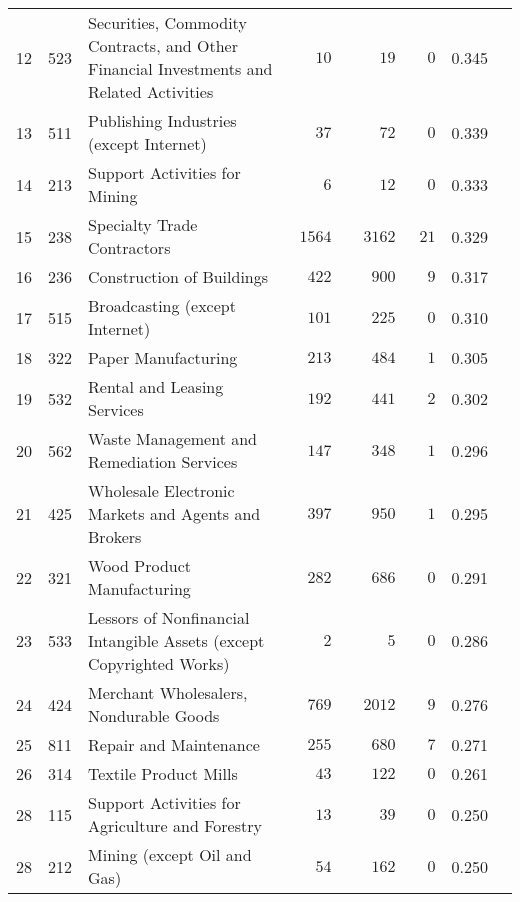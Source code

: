 \documentclass[9pt, oneside]{article}   	%
\begin{document}
\begin{longtable}{lcp{3 in}ccccc}
12  & 523 & Securities, Commodity Contracts, and Other Financial Investments and Related Activities & $\phantom{000}10$ & $\phantom{0000}19$ & $\phantom{00}0$ & 0.345 \\
13  & 511 & Publishing Industries (except Internet) & $\phantom{000}37$ & $\phantom{0000}72$ & $\phantom{00}0$ & 0.339 \\
14  & 213 & Support Activities for Mining & $\phantom{0000}6$ & $\phantom{0000}12$ & $\phantom{00}0$ & 0.333 \\
15  & 238 & Specialty Trade Contractors & $\phantom{0}1564$ & $\phantom{00}3162$ & $\phantom{0}21$ & 0.329 \\
16  & 236 & Construction of Buildings & $\phantom{00}422$ & $\phantom{000}900$ & $\phantom{00}9$ & 0.317 \\
17  & 515 & Broadcasting (except Internet) & $\phantom{00}101$ & $\phantom{000}225$ & $\phantom{00}0$ & 0.310 \\
18  & 322 & Paper Manufacturing & $\phantom{00}213$ & $\phantom{000}484$ & $\phantom{00}1$ & 0.305 \\
19  & 532 & Rental and Leasing Services & $\phantom{00}192$ & $\phantom{000}441$ & $\phantom{00}2$ & 0.302 \\
20  & 562 & Waste Management and Remediation Services & $\phantom{00}147$ & $\phantom{000}348$ & $\phantom{00}1$ & 0.296 \\
21  & 425 & Wholesale Electronic Markets and Agents and Brokers & $\phantom{00}397$ & $\phantom{000}950$ & $\phantom{00}1$ & 0.295 \\
22  & 321 & Wood Product Manufacturing & $\phantom{00}282$ & $\phantom{000}686$ & $\phantom{00}0$ & 0.291 \\
23  & 533 & Lessors of Nonfinancial Intangible Assets (except Copyrighted Works) & $\phantom{0000}2$ & $\phantom{00000}5$ & $\phantom{00}0$ & 0.286 \\
24  & 424 & Merchant Wholesalers, Nondurable Goods & $\phantom{00}769$ & $\phantom{00}2012$ & $\phantom{00}9$ & 0.276 \\
25  & 811 & Repair and Maintenance & $\phantom{00}255$ & $\phantom{000}680$ & $\phantom{00}7$ & 0.271 \\
26  & 314 & Textile Product Mills & $\phantom{000}43$ & $\phantom{000}122$ & $\phantom{00}0$ & 0.261 \\
28  & 115 & Support Activities for Agriculture and Forestry & $\phantom{000}13$ & $\phantom{0000}39$ & $\phantom{00}0$ & 0.250 \\
28  & 212 & Mining (except Oil and Gas) & $\phantom{000}54$ & $\phantom{000}162$ & $\phantom{00}0$ & 0.250 \\

\end{longtable}
\end{document}
